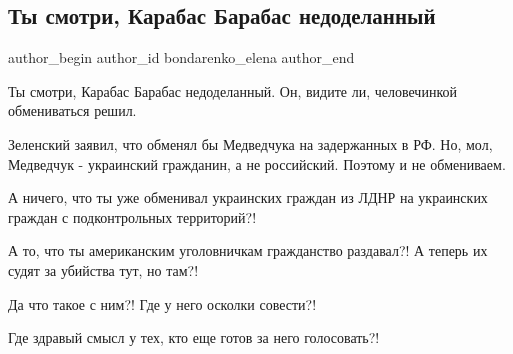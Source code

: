  
 
 
 
 
 
\subsection{Ты смотри, Карабас Барабас недоделанный}
\label{sec:17_10_2021.fb.bondarenko_elena.1.karabas_barabas_zelja_medvedchuk}
 
\ifcmt
 author_begin
   author_id bondarenko_elena
 author_end
\fi

Ты смотри, Карабас Барабас недоделанный. Он, видите ли, человечинкой
обмениваться решил.

Зеленский заявил, что обменял бы Медведчука на задержанных в РФ. Но, мол,
Медведчук - украинский гражданин, а не российский. Поэтому и не обмениваем.

А ничего, что ты уже обменивал украинских граждан из ЛДНР на украинских граждан
с подконтрольных территорий?!

А то, что ты американским уголовничкам гражданство раздавал?! А теперь их судят
за убийства тут, но там?!

Да что такое с ним?! Где у него осколки совести?!

Где здравый смысл у тех, кто еще готов за него голосовать?!

